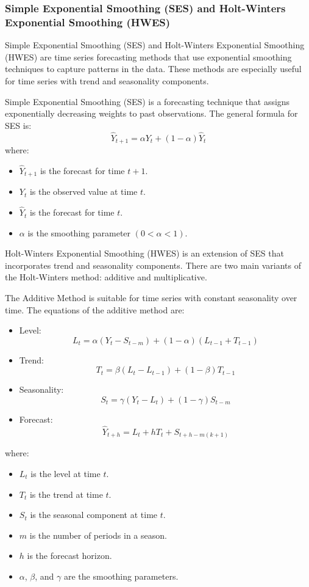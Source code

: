 \subsubsection{Simple Exponential Smoothing (SES) and Holt-Winters Exponential Smoothing (HWES)}

Simple Exponential Smoothing (SES) and Holt-Winters Exponential Smoothing (HWES) are time series forecasting methods that use exponential smoothing techniques to capture patterns in the data. These methods are especially useful for time series with trend and seasonality components.
\vspace{10pt}

Simple Exponential Smoothing (SES) is a forecasting technique that assigns exponentially decreasing weights to past observations. The general formula for SES is:
\[
\hat{Y}_{t+1} = \alpha Y_t + (1-\alpha) \hat{Y}_t
\]
where:
\begin{itemize}
    \item \( \hat{Y}_{t+1} \) is the forecast for time \( t+1 \).
    \item \( Y_t \) is the observed value at time \( t \).
    \item \( \hat{Y}_t \) is the forecast for time \( t \).
    \item \( \alpha \) is the smoothing parameter \( (0 < \alpha < 1) \).
\end{itemize}

Holt-Winters Exponential Smoothing (HWES) is an extension of SES that incorporates trend and seasonality components. There are two main variants of the Holt-Winters method: additive and multiplicative.

The Additive Method is suitable for time series with constant seasonality over time. The equations of the additive method are:
\begin{itemize}
    \item Level:
    \[
    L_t = \alpha (Y_t - S_{t-m}) + (1-\alpha)(L_{t-1} + T_{t-1})
    \]
    \item Trend:
    \[
    T_t = \beta (L_t - L_{t-1}) + (1-\beta) T_{t-1}
    \]
    \item Seasonality:
    \[
    S_t = \gamma (Y_t - L_t) + (1-\gamma) S_{t-m}
    \]
    \item Forecast:
    \[
    \hat{Y}_{t+h} = L_t + h T_t + S_{t+h-m(k+1)}
    \]
\end{itemize}

where:
\begin{itemize}
    \item \( L_t \) is the level at time \( t \).
    \item \( T_t \) is the trend at time \( t \).
    \item \( S_t \) is the seasonal component at time \( t \).
    \item \( m \) is the number of periods in a season.
    \item \( h \) is the forecast horizon.
    \item \( \alpha \), \( \beta \), and \( \gamma \) are the smoothing parameters.
\end{itemize}

